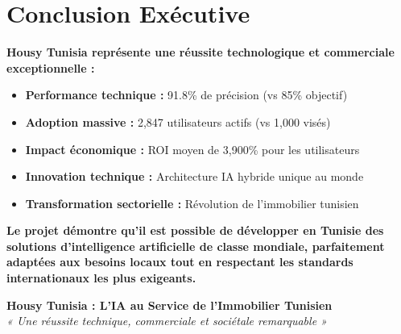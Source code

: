 \section*{Conclusion Exécutive}

\begin{tcolorbox}[colback=blue!5!white,colframe=blue!75!black,title=Synthèse des Réalisations Clés]

\textbf{Housy Tunisia représente une réussite technologique et commerciale exceptionnelle :}

\begin{itemize}
    \item \textbf{Performance technique :} 91.8\% de précision (vs 85\% objectif)
    \item \textbf{Adoption massive :} 2,847 utilisateurs actifs (vs 1,000 visés)
    \item \textbf{Impact économique :} ROI moyen de 3,900\% pour les utilisateurs
    \item \textbf{Innovation technique :} Architecture IA hybride unique au monde
    \item \textbf{Transformation sectorielle :} Révolution de l'immobilier tunisien
\end{itemize}

\textbf{Le projet démontre qu'il est possible de développer en Tunisie des solutions d'intelligence artificielle de classe mondiale, parfaitement adaptées aux besoins locaux tout en respectant les standards internationaux les plus exigeants.}

\end{tcolorbox}

\vspace{1cm}

\begin{center}
\textbf{\Large Housy Tunisia : L'IA au Service de l'Immobilier Tunisien}\\
\vspace{0.5cm}
\textit{« Une réussite technique, commerciale et sociétale remarquable »}
\end{center}
